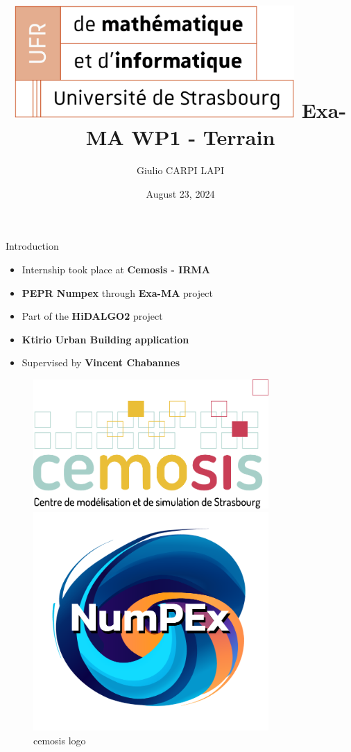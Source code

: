 \documentclass[10pt]{beamer}
\date{August 23, 2024}
\title[Exa-MA WP1 - Terrain | Internship presentation]{
  \includegraphics[width=0.8\textwidth]{images/logo-ufr.png}
  Exa-MA WP1 - Terrain}
\author[Giulio Carpi Lapi]{Giulio CARPI LAPI}
\begin{document}
\begin{frame}
  \titlepage
\end{frame}

\begin{frame}{Introduction}
  \begin{itemize}
    \Large
    \item Internship took place at \textbf{Cemosis - IRMA}
    \item \textbf{PEPR Numpex} through \textbf{Exa-MA} project
    \item Part of the \textbf{HiDALGO2} project
    \item \textbf{Ktirio Urban Building application}
    \item Supervised by \textbf{Vincent Chabannes}
  \end{itemize}
  \vfill
  \begin{figure}
    \centering
    \begin{minipage}{0.3\textwidth}
        \centering
        \includegraphics[width=0.8\textwidth]{images/logo-cemosis.png}
        \caption{cemosis logo \cite{cemosis}}
    \end{minipage}
    \begin{minipage}{0.3\textwidth}
        \centering
        \includegraphics[width=0.8\textwidth]{images/logo-numpex.png}

\end{minipage}
\end{figure}
\end{frame}
\end{document}
